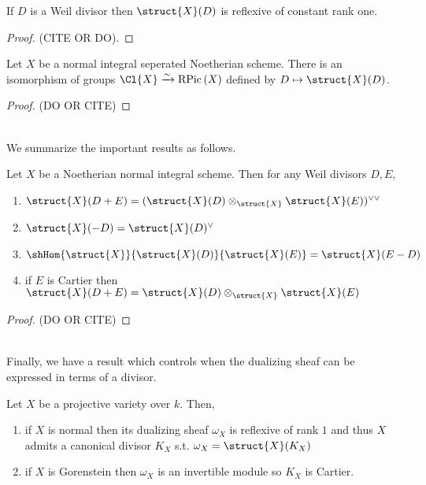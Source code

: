 \documentclass[12pt]{article}
\begin{document}
\begin{prop}
If $D$ is a Weil divisor then $\struct{X}(D)$ is reflexive of constant rank one. 
\end{prop}

\begin{proof}
(CITE OR DO).
\end{proof}

\begin{theorem}
Let $X$ be a normal integral seperated Noetherian scheme. There is an isomorphism of groups $\Cl{X} \xrightarrow{\sim} \RPic{X}$ defined by $D \mapsto \struct{X}(D)$.
\end{theorem}

\begin{proof}
(DO OR CITE)
\end{proof}
\noindent\\
We summarize the important results as follows.
\begin{theorem}
Let $X$ be a Noetherian normal integral scheme. Then for any Weil divisors $D, E$,
\begin{enumerate}
\item $\struct{X}(D + E) = (\struct{X}(D) \otimes_{\struct{X}} \struct{X}(E))^{\vee \vee}$
\item $\struct{X}(-D) = \struct{X}(D)^\vee$
\item $\shHom{\struct{X}}{\struct{X}(D)}{\struct{X}(E)} = \struct{X}(E - D)$
\item if $E$ is Cartier then $\struct{X}(D + E) = \struct{X}(D) \otimes_{\struct{X}} \struct{X}(E)$
\end{enumerate}
\begin{center}

\begin{proof}
(DO OR CITE)
\end{proof}

\end{center}
\end{theorem}
\noindent\\
Finally, we have a result which controls when the dualizing sheaf can be expressed in terms of a divisor.
\begin{prop}
Let $X$ be a projective variety over $k$. Then,
\begin{enumerate}
\item if $X$ is normal then its dualizing sheaf $\omega_X$ is reflexive of rank $1$ and thus $X$ admits a canonical divisor $K_X$ s.t. $\omega_X = \struct{X}(K_X)$
\item if $X$ is Gorenstein then $\omega_X$ is an invertible module so $K_X$ is Cartier.
\end{enumerate}
\end{prop}
\end{document}
